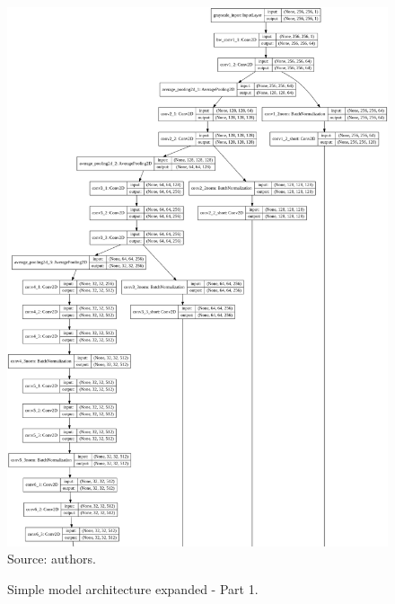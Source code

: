 \documentclass[12pt,openright,oneside,a4paper,english, brazilian]{abntex2}
\begin{document}
\begin{otherlanguage}{english}
\begin{apendicesenv}
\begin{figure}[!htb]
\centering
\caption{Simple model architecture expanded - Part 1.}
\includegraphics[width=\textwidth,height=\textheight,keepaspectratio]{model_plot/Simple1}
Source: authors.
\label{simple_plot_1}
\end{figure}


\end{apendicesenv}
\end{otherlanguage}
\end{document}
